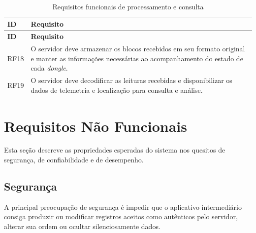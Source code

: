 \begin{longtable}{p{}p{}}
\caption{Requisitos funcionais de processamento e consulta}
\label{tab:rf-processamento}\\
\hline
\textbf{ID} & \textbf{Requisito} \\
\hline
\endfirsthead

\hline
\textbf{ID} & \textbf{Requisito} \\
\hline
\endhead

RF18 & O servidor deve armazenar os blocos recebidos em seu
formato original e manter as informações necessárias ao
acompanhamento do estado de cada \textit{dongle}. \\

RF19 & O servidor deve decodificar as leituras recebidas
e disponibilizar os dados de telemetria e localização
para consulta e análise. \\

\hline
\end{longtable}


\section{Requisitos Não Funcionais}

Esta seção descreve as propriedades esperadas do sistema nos quesitos de segurança, de confiabilidade e de desempenho. 

\subsection{Segurança}

A principal preocupação de segurança é impedir que o aplicativo intermediário consiga produzir ou modificar registros aceitos como autênticos pelo servidor, alterar sua ordem ou ocultar silenciosamente dados.


